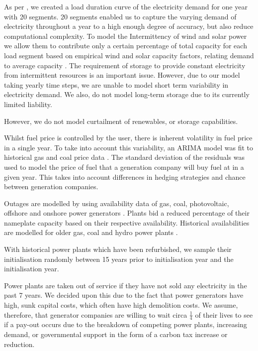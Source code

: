 As per \cite{Chappin2017}, we created a load duration curve of the electricity demand for one year with 20 segments. 20 segments enabled us to capture the varying demand of electricity throughout a year to a high enough degree of accuracy, but also reduce computational complexity. To model the Intermittency of wind and solar power we allow them to contribute only a certain percentage of total capacity for each load segment based on empirical wind and solar capacity factors, relating demand to average capacity \cite{Pfenninger2016, Staffell2016, Chappin2017}. The requirement of storage to provide constant electricity from intermittent resources is an important issue. However, due to our model taking yearly time steps, we are unable to model short term variability in electricity demand. We also, do not model long-term storage due to its currently limited liability. 

However, we do not model curtailment of renewables, or storage capabilities. 

Whilst fuel price is controlled by the user, there is inherent volatility in fuel price in a single year. To take into account this variability, an ARIMA model was fit to historical gas and coal price data \cite{coalprices,gasprices}. The standard deviation of the residuals was used to model the price of fuel that a generation company will buy fuel at in a given year. This takes into account differences in hedging strategies and chance between generation companies.

Outages are modelled by using availability data of gas, coal, photovoltaic, offshore and onshore power generators \cite{Ltd2016, Hunt2015, carroll-j}. Plants bid a reduced percentage of their nameplate capacity based on their respective availability. Historical availabilities are modelled for older gas, coal and hydro power plants \cite{AlbertaSystemElectricOperator2016}.

With historical power plants which have been refurbished, we sample their initialisation randomly between 15 years prior to initialisation year and the initialisation year.

Power plants are taken out of service if they have not sold any electricity in the past 7 years. We decided upon this due to the fact that power generators have high, sunk capital costs, which often have high demolition costs. We assume, therefore, that generator companies are willing to wait circa $\frac{1}{4}$ of their lives to see if a pay-out occurs due to the breakdown of competing power plants, increasing demand, or governmental support in the form of a carbon tax increase or reduction.


